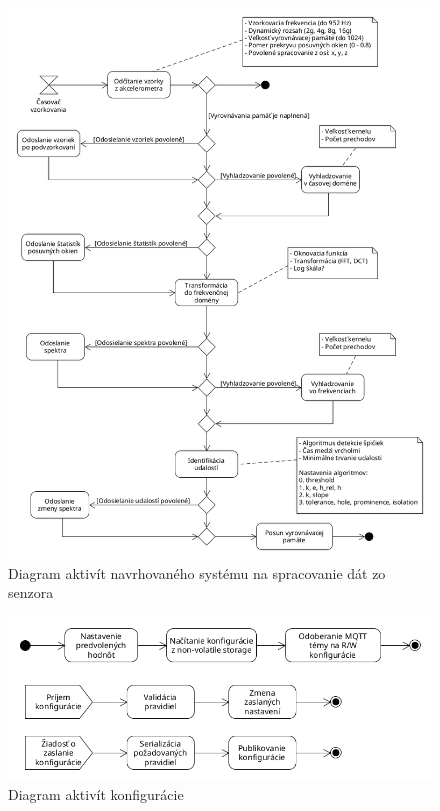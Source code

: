 \begin{figure}[h]
	\centering
	\includegraphics[width=\textwidth]{figures/pipeline.png}
	\caption{Diagram aktivít navrhovaného systému na spracovanie dát zo senzora}
	\label{fig:design}
\end{figure}

\begin{figure}[h]
	\centering
	\includegraphics[width=\textwidth]{figures/configuration.png}
	\caption{Diagram aktivít konfigurácie}
	\label{fig:design}
\end{figure}

\emptypage
